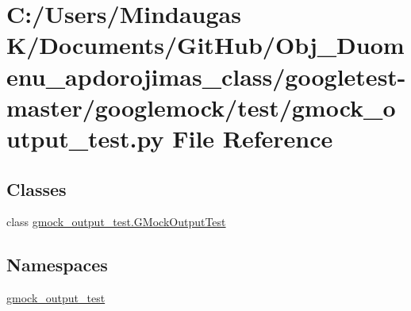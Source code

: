 \hypertarget{googletest-master_2googlemock_2test_2gmock__output__test_8py}{}\section{C\+:/\+Users/\+Mindaugas K/\+Documents/\+Git\+Hub/\+Obj\+\_\+\+Duomenu\+\_\+apdorojimas\+\_\+class/googletest-\/master/googlemock/test/gmock\+\_\+output\+\_\+test.py File Reference}
\label{googletest-master_2googlemock_2test_2gmock__output__test_8py}
\subsection*{Classes}
\begin{DoxyCompactItemize}
\item 
class \mbox{\hyperlink{classgmock__output__test_1_1_g_mock_output_test}{gmock\+\_\+output\+\_\+test.\+G\+Mock\+Output\+Test}}
\end{DoxyCompactItemize}
\subsection*{Namespaces}
\begin{DoxyCompactItemize}
\item 
 \mbox{\hyperlink{namespacegmock__output__test}{gmock\+\_\+output\+\_\+test}}
\end{DoxyCompactItemize}
